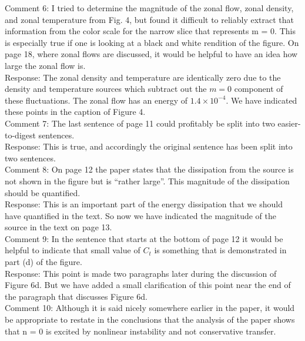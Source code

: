 \documentclass[12pt]{article}
\begin{document}
Comment 6:   I tried to determine the magnitude of the zonal flow, zonal density, and zonal
temperature from Fig. 4, but found it difficult to reliably extract that information from the
color scale for the narrow slice that represents m = 0. This is especially true if one is
looking at a black and white rendition of the figure. On page 18, where zonal flows are
discussed, it would be helpful to have an idea how large the zonal flow is. \\

Response: The zonal density and temperature are identically zero due to the density and temperature sources which subtract out the $m=0$ component of these fluctuations. The zonal flow has an energy
of $1.4 \times 10^{-4}$. We have indicated these points in the caption of Figure 4. \\

Comment 7:   The last sentence of page 11 could profitably be split into two easier-to-digest sentences. \\

Response: This is true, and accordingly the original sentence has been split into two sentences. \\

Comment 8:   On page 12 the paper states that the dissipation from the source is not shown in the
figure but is “rather large”. This magnitude of the dissipation should be quantified. \\

Response: This is an important part of the energy dissipation that we should have quantified in the text. So now we have indicated the magnitude of the source in the text on page 13. \\

Comment 9:   In the sentence that starts at the bottom of page 12 it would be helpful to indicate that
small value of $C_t$ is something that is demonstrated in part (d) of the figure. \\

Response: This point is made two paragraphs later during the discussion of Figure 6d. But we have added a small clarification of this point near the end of the paragraph that discusses Figure 6d. \\

Comment 10:   Although it is said nicely somewhere earlier in the paper, it would be appropriate to
restate in the conclusions that the analysis of the paper shows that n = 0 is excited by
nonlinear instability and not conservative transfer. \\
\end{document}
